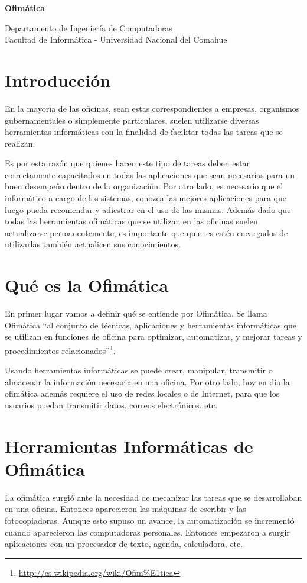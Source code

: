 \documentclass[12pt]{article}
\def\maketitle{

\makeatletter
{\color{bl} \centering \huge \sc \textbf{
Ofimática\\
 \vspace*{8pt} }\par}
 \makeatother


 \makeatletter
 {\centering \small 
 	Departamento de Ingeniería de Computadoras \\
 	Facultad de Informática - Universidad Nacional del Comahue \\
 	\vspace{20pt} }
 \makeatother

}
\begin{document}
\thispagestyle{empty}
\maketitle
\setlength{\parindent}{0pt}


\section{Introducción}

En la mayoría de las oficinas, sean estas correspondientes a empresas, organismos gubernamentales o simplemente particulares, suelen utilizarse diversas herramientas informáticas con la finalidad de facilitar todas las tareas que se realizan.

Es por esta razón que quienes hacen este tipo de tareas deben estar correctamente capacitados en todas las aplicaciones que sean necesarias para un buen desempeño dentro de la organización. Por otro lado, es necesario que el informático a cargo de los sistemas, conozca las mejores aplicaciones para que luego pueda recomendar y adiestrar en el uso de las mismas. Además dado que todas las herramientas ofimáticas que se utilizan en las oficinas suelen actualizarse permanentemente, es importante que quienes estén encargados de utilizarlas también actualicen sus conocimientos.


\section{Qué es la Ofimática}

En primer lugar vamos a definir qué se entiende por Ofimática. Se llama Ofimática “al conjunto de técnicas, aplicaciones y herramientas informáticas que se utilizan en funciones de oficina para optimizar, automatizar, y mejorar tareas y procedimientos relacionados”\footnote{\url{http://es.wikipedia.org/wiki/Ofim\%E1tica}}.

Usando herramientas informáticas se puede crear, manipular, transmitir o almacenar la información necesaria en una oficina. Por otro lado, hoy en día la ofimática además requiere el uso de redes locales o de Internet, para que los usuarios puedan transmitir datos, correos electrónicos, etc.

\section{Herramientas Informáticas de Ofimática}

La ofimática surgió ante la necesidad de mecanizar las tareas que se desarrollaban en una oficina. Entonces aparecieron las máquinas de escribir y las fotocopiadoras. Aunque esto supuso un avance, la automatización se incrementó cuando aparecieron las computadoras personales. Entonces empezaron a surgir aplicaciones con un procesador de texto, agenda, calculadora, etc. 
\end{document}
